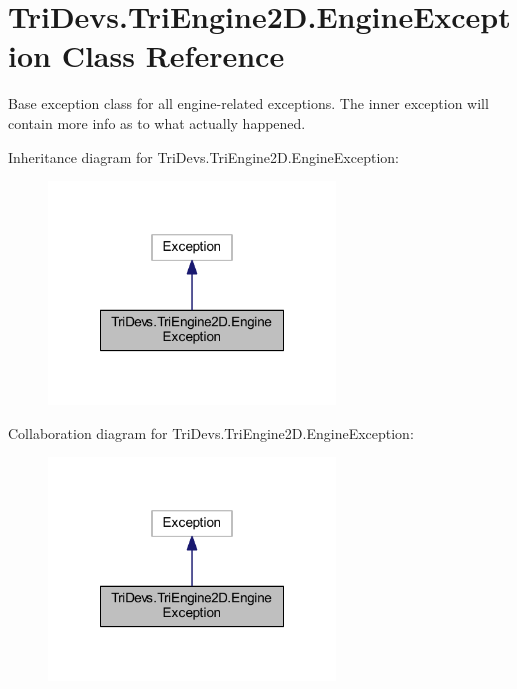 \hypertarget{class_tri_devs_1_1_tri_engine2_d_1_1_engine_exception}{\section{Tri\-Devs.\-Tri\-Engine2\-D.\-Engine\-Exception Class Reference}
\label{class_tri_devs_1_1_tri_engine2_d_1_1_engine_exception}
}


Base exception class for all engine-\/related exceptions. The inner exception will contain more info as to what actually happened.  




Inheritance diagram for Tri\-Devs.\-Tri\-Engine2\-D.\-Engine\-Exception\-:\nopagebreak
\begin{figure}[H]
\begin{center}
\leavevmode
\includegraphics[width=216pt]{class_tri_devs_1_1_tri_engine2_d_1_1_engine_exception__inherit__graph}
\end{center}
\end{figure}


Collaboration diagram for Tri\-Devs.\-Tri\-Engine2\-D.\-Engine\-Exception\-:\nopagebreak
\begin{figure}[H]
\begin{center}
\leavevmode
\includegraphics[width=216pt]{class_tri_devs_1_1_tri_engine2_d_1_1_engine_exception__coll__graph}
\end{center}
\end{figure}


